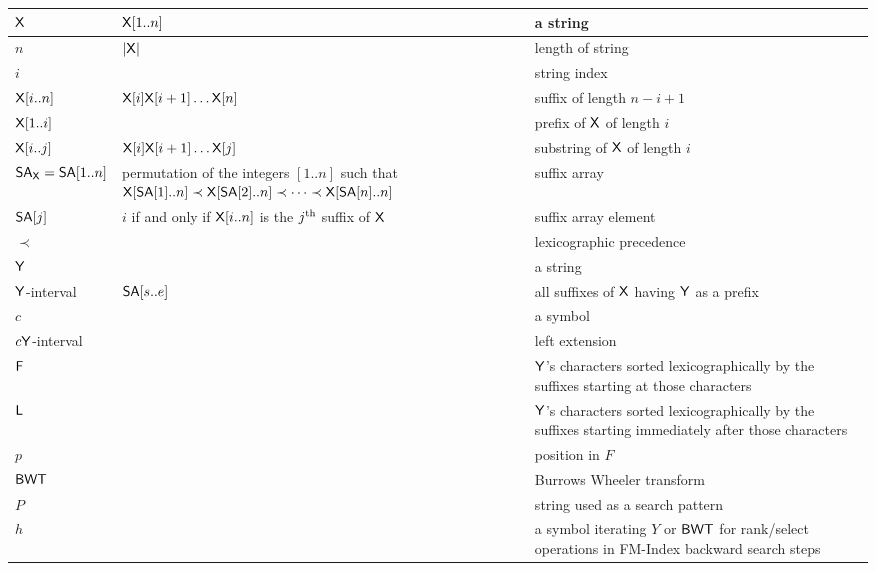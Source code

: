 \documentclass{article}
\begin{document}
\begin{table}
  \begin{tabularx}{\textwidth}{|l|p{2in}|X|}

    \hline



    $\mathsf{X}$ & $ \mathsf{X}[1..n] $ & a string \\ \hline
    $n$ & $|\mathsf{X}|$ & length of string \\ \hline
    $i$ & & string index \\ \hline
    $\mathsf{X}[i..n]$ & $\mathsf{X}[i]\mathsf{X}[i+1]\ldots \mathsf{X}[n]$ & suffix  of length $n-i+1$ \\ \hline
    $\mathsf{X}[1..i]$ & & prefix of $\mathsf{X}$ of length $i$ \\ \hline
    $\mathsf{X}[i..j]$ &  $\mathsf{X}[i]\mathsf{X}[i+1]\ldots \mathsf{X}[j]$ & substring of $\mathsf{X}$ of length $i$ \\ \hline
    $\mbox{\rm {\sf SA}}_{\mathsf{X}} = \mbox{\rm {\sf SA}}[1..n]$ & permutation of the integers $[1..n]$ such that $\mathsf{X}[\mbox{\rm {\sf SA}}[1]..n] \prec \mathsf{X}[\mbox{\rm {\sf SA}}[2]..n] \prec \cdots \prec \mathsf{X}[\mbox{\rm {\sf SA}}[n]..n]$ & suffix array \\ \hline
    $\mbox{\rm {\sf SA}}[j]$ & $i$ if and only if $\mathsf{X}[i..n]$ is the $j^{\mbox{{\scriptsize th}}}$ suffix of $\mathsf{X}$ & suffix array element\\ \hline
    $\prec$ & & lexicographic precedence \\ \hline
    $\mathsf{Y}$ & & a string \\ \hline
    $\mathsf{Y}$-interval & $\mbox{\rm {\sf SA}}[s..e]$ &  all suffixes of $\mathsf{X}$ having $\mathsf{Y}$ as a prefix \\ \hline
    $c$ & & a symbol \\ \hline
    $c\mathsf{Y}$-interval & & left extension \\ \hline
    $\mbox{\rm {\sf F}}$ & & $\mathsf{Y}$'s characters sorted lexicographically by the suffixes starting at those characters \\ \hline
    $\mbox{\rm {\sf L}}$ & & $\mathsf{Y}$'s characters sorted lexicographically by the suffixes starting immediately after those characters \\ \hline
    $p$ & & position in $F$ \\ \hline
    $\mbox{\rm {\sf BWT}}$ & & Burrows Wheeler transform \\ \hline
    $P$ & & string used as a search pattern \\ \hline
    $h$ & & a symbol iterating $Y$ or $\mbox{\rm {\sf BWT}}$ for rank/select operations in FM-Index backward search steps \\ \hline

\end{tabularx}
\end{table}
\end{document}
